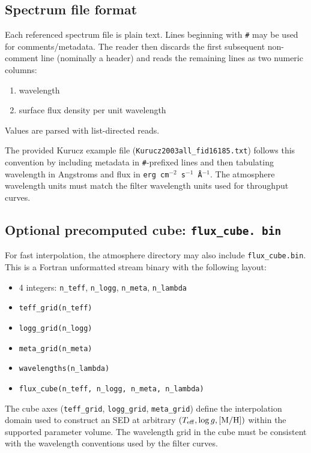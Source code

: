 \documentclass[linenumbers,apj,twocolumn, floatfix]{aastex701}
\begin{document}
\subsection{Spectrum file format}

Each referenced spectrum file is plain text.
Lines beginning with \texttt{\#} may be used for comments/metadata.
The reader then discards the first subsequent non-comment line (nominally a header) and reads the remaining lines as two numeric columns: \begin{enumerate} \item wavelength \item surface flux density per unit wavelength \end{enumerate} Values are parsed with list-directed reads.

The provided Kurucz example file (\texttt{Kurucz2003all\_fid16185.txt}) follows this convention by including metadata in \texttt{\#}-prefixed lines and then tabulating wavelength in Angstroms and flux in \texttt{erg\,cm$^{-2}$\,s$^{-1}$\,\AA$^{-1}$}.
The atmosphere wavelength units must match the filter wavelength units used for throughput curves.

\subsection{Optional precomputed cube: \texttt{flux\_cube.
		bin}} 

For fast interpolation, the atmosphere directory may also include \texttt{flux\_cube.bin}.
This is a Fortran unformatted stream binary with the following layout: 

\begin{itemize} \item 4 integers: \texttt{n\_teff}, \texttt{n\_logg}, \texttt{n\_meta}, \texttt{n\_lambda} \item \texttt{teff\_grid(n\_teff)} \item \texttt{logg\_grid(n\_logg)} \item \texttt{meta\_grid(n\_meta)} \item \texttt{wavelengths(n\_lambda)} \item \texttt{flux\_cube(n\_teff, n\_logg, n\_meta, n\_lambda)} \end{itemize} 

The cube axes (\texttt{teff\_grid}, \texttt{logg\_grid}, \texttt{meta\_grid}) define the interpolation domain used to construct an SED at arbitrary $(T_{\rm eff}, \log g, \mathrm{[M/H]})$ within the supported parameter volume.
The wavelength grid in the cube must be consistent with the wavelength conventions used by the filter curves.

{}

\end{document}
